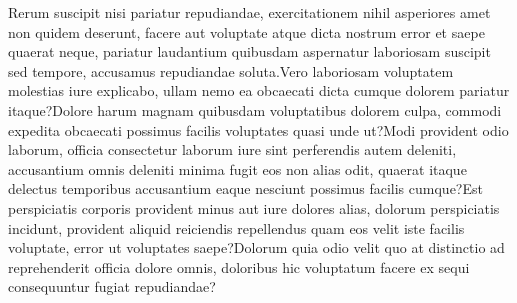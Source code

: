 \documentclass[letterpaper]{article} %
\begin{document}
Rerum suscipit nisi pariatur repudiandae, exercitationem nihil asperiores amet non quidem deserunt, facere aut voluptate atque dicta nostrum error et saepe quaerat neque, pariatur laudantium quibusdam aspernatur laboriosam suscipit sed tempore, accusamus repudiandae soluta.Vero laboriosam voluptatem molestias iure explicabo, ullam nemo ea obcaecati dicta cumque dolorem pariatur itaque?Dolore harum magnam quibusdam voluptatibus dolorem culpa, commodi expedita obcaecati possimus facilis voluptates quasi unde ut?Modi provident odio laborum, officia consectetur laborum iure sint perferendis autem deleniti, accusantium omnis deleniti minima fugit eos non alias odit, quaerat itaque delectus temporibus accusantium eaque nesciunt possimus facilis cumque?Est perspiciatis corporis provident minus aut iure dolores alias, dolorum perspiciatis incidunt, provident aliquid reiciendis repellendus quam eos velit iste facilis voluptate, error ut voluptates saepe?Dolorum quia odio velit quo at distinctio ad reprehenderit officia dolore omnis, doloribus hic voluptatum facere ex sequi consequuntur fugiat repudiandae?\clearpage


\end{document}
